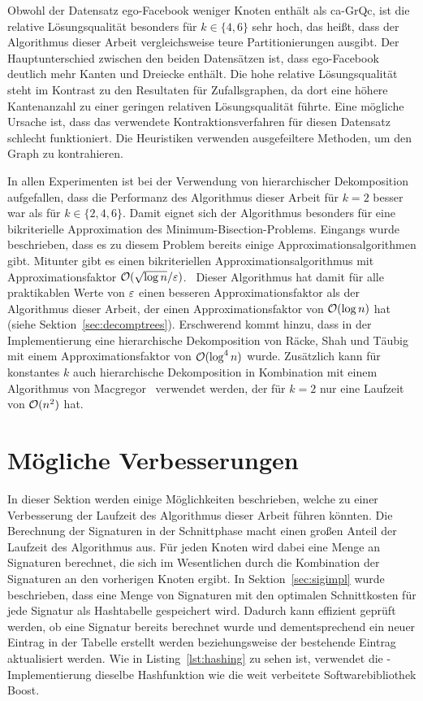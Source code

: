 Obwohl der Datensatz ego-Facebook weniger Knoten enthält als ca-GrQc, ist die relative Lösungsqualität besonders für $k \in \{4,6\}$ sehr hoch, das heißt, dass der Algorithmus dieser Arbeit vergleichsweise teure Partitionierungen ausgibt.
Der Hauptunterschied zwischen den beiden Datensätzen ist, dass ego-Facebook deutlich mehr Kanten und Dreiecke enthält.
Die hohe relative Lösungsqualität steht im Kontrast zu den Resultaten für Zufallsgraphen, da dort eine höhere Kantenanzahl zu einer geringen relativen Lösungsqualität führte.
Eine mögliche Ursache ist, dass das verwendete Kontraktionsverfahren für diesen Datensatz schlecht funktioniert.
Die Heuristiken verwenden ausgefeiltere Methoden, um den Graph zu kontrahieren.

In allen Experimenten ist bei der Verwendung von hierarchischer Dekomposition aufgefallen, dass die Performanz des Algorithmus dieser Arbeit für $k=2$ besser war als für $k \in \{2, 4, 6\}$.
Damit eignet sich der Algorithmus besonders für eine bikriterielle Approximation des Minimum-Bisection-Problems.
Eingangs wurde beschrieben, dass es zu diesem Problem bereits einige Approximationsalgorithmen gibt.
Mitunter gibt es einen bikriteriellen Approximationsalgorithmus mit Approximationsfaktor $\mathcal{O}(\sqrt{\log n}/\varepsilon)$.~\cite{LR99, ARV09}
Dieser Algorithmus hat damit für alle praktikablen Werte von $\varepsilon$ einen besseren Approximationsfaktor als der Algorithmus dieser Arbeit, der einen Approximationsfaktor von $\mathcal{O}(\log n)$ hat (siehe Sektion~\ref{sec:decomptrees}).
Erschwerend kommt hinzu, dass in der Implementierung eine hierarchische Dekomposition von Räcke, Shah und Täubig~\cite{RST14} mit einem Approximationsfaktor von $\mathcal{O}(\log^4 n)$ wurde. 
Zusätzlich kann für konstantes $k$ auch hierarchische Dekomposition in Kombination mit einem Algorithmus von Macgregor~\cite{mcg78} verwendet werden, der für $k=2$ nur eine Laufzeit von $\mathcal{O}(n^2)$ hat.

\section{Mögliche Verbesserungen}\label{sec:improv}
In dieser Sektion werden einige Möglichkeiten beschrieben, welche zu einer Verbesserung der Laufzeit des Algorithmus dieser Arbeit führen könnten.
Die Berechnung der Signaturen in der Schnittphase macht einen großen Anteil der Laufzeit des Algorithmus aus.
Für jeden Knoten wird dabei eine Menge an Signaturen berechnet, die sich im Wesentlichen durch die Kombination der Signaturen an den vorherigen Knoten ergibt.
In Sektion~\ref{sec:sigimpl} wurde beschrieben, dass eine Menge von Signaturen mit den optimalen Schnittkosten für jede Signatur als Hashtabelle gespeichert wird.
Dadurch kann effizient geprüft werden, ob eine Signatur bereits berechnet wurde und dementsprechend ein neuer Eintrag in der Tabelle erstellt werden beziehungsweise der bestehende Eintrag aktualisiert werden.
Wie in Listing~\ref{lst:hashing} zu sehen ist, verwendet die \Cpp{}\hyp Implementierung dieselbe Hashfunktion wie die weit verbeitete Softwarebibliothek Boost.

